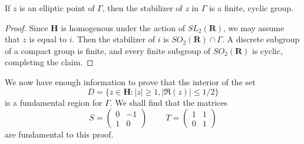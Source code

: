 \begin{theorem}
    If $z$ is an elliptic point of $\Gamma$, then the stabilizer of $z$ in $\Gamma$ is a finite, cyclic group.
\end{theorem}
\begin{proof}
    Since $\mathbf{H}$ is homogenous under the action of $SL_2(\mathbf{R})$, we may assume that $z$ is equal to $i$. Then the stabilizer of $i$ is $SO_2(\mathbf{R}) \cap \Gamma$. A discrete subgroup of a compact group is finite, and every finite subgroup of $SO_2(\mathbf{R})$ is cyclic, completing the claim.
\end{proof}

We now have enough information to prove that the interior of the set
%
\[ D = \{ z \in \mathbf{H} : |z| \geq 1, |\Re(z)| \leq 1/2 \} \]
%
is a fundamental region for $\Gamma$. We shall find that the matrices
%
\[ S = \begin{pmatrix} 0 & -1 \\ 1 & 0 \end{pmatrix}\ \ \ \ \ \ \ \ \ \ T = \begin{pmatrix} 1 & 1 \\ 0 & 1 \end{pmatrix} \]
%
are fundamental to this proof.

